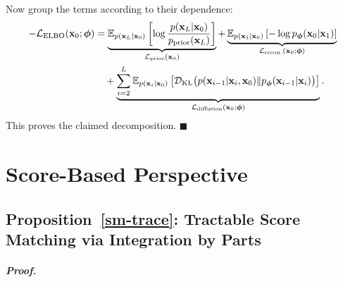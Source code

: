 Now group the terms according to their dependence:
\begin{align*}
-\mathcal{L}_{\text{ELBO}}({\mathbf{x}}_0;\bm{\phi})
&=
\underbrace{
\mathbb{E}_{p({\mathbf{x}}_L| {\mathbf{x}}_0)}
\left[
\log \frac{p({\mathbf{x}}_L| {\mathbf{x}}_0)}{p_{\text{prior}}({\mathbf{x}}_L)}
\right]
}_{\mathcal{L}_{\text{prior}}({\mathbf{x}}_0)}
+
\underbrace{
\mathbb{E}_{p({\mathbf{x}}_1| {\mathbf{x}}_0)}
\left[
-\log p_{\bm{\phi}}({\mathbf{x}}_0| {\mathbf{x}}_1)
\right]
}_{\mathcal{L}_{\text{recon.}}({\mathbf{x}}_0;\bm{\phi})}
\\
&\quad+
\underbrace{
\sum_{i=2}^L
\mathbb{E}_{p({\mathbf{x}}_i| {\mathbf{x}}_0)}
\left[
\mathcal{D}_{\mathrm{KL}}
\big(
p({\mathbf{x}}_{i-1}| {\mathbf{x}}_i,{\mathbf{x}}_0)
\|
p_{\bm{\phi}}({\mathbf{x}}_{i-1}| {\mathbf{x}}_i)
\big)
\right]
}_{\mathcal{L}_{\text{diffusion}}({\mathbf{x}}_0;\bm{\phi})}.
\end{align*}
This proves the claimed decomposition.
\hfill$\blacksquare$


\clearpage
\newpage

\section{Score-Based Perspective}\label{app-sec:score-proof}

\subsection{Proposition~\ref{sm-trace}: Tractable Score Matching via Integration by Parts}\label{app-sec:sm-trace}
\paragraph{\textit{Proof.}}

